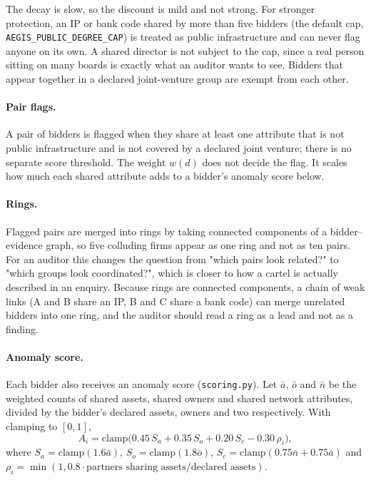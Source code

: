 The decay is slow, so the discount is mild and not strong. For stronger protection, an IP or bank code shared by more than five bidders (the default cap, \texttt{AEGIS\_PUBLIC\_DEGREE\_CAP}) is treated as public infrastructure and can never flag anyone on its own. A shared director is not subject to the cap, since a real person sitting on many boards is exactly what an auditor wants to see. Bidders that appear together in a declared joint-venture group are exempt from each other.

\paragraph{Pair flags.} A pair of bidders is flagged when they share at least one attribute that is not public infrastructure and is not covered by a declared joint venture; there is no separate score threshold. The weight $w(d)$ does not decide the flag. It scales how much each shared attribute adds to a bidder's anomaly score below.

\paragraph{Rings.} Flagged pairs are merged into rings by taking connected components of a bidder--evidence graph, so five colluding firms appear as one ring and not as ten pairs. For an auditor this changes the question from "which pairs look related?" to "which groups look coordinated?", which is closer to how a cartel is actually described in an enquiry. Because rings are connected components, a chain of weak links (A and B share an IP, B and C share a bank code) can merge unrelated bidders into one ring, and the auditor should read a ring as a lead and not as a finding.

\paragraph{Anomaly score.} Each bidder also receives an anomaly score (\texttt{scoring.py}). Let $\bar a$, $\bar o$ and $\bar n$ be the weighted counts of shared assets, shared owners and shared network attributes, divided by the bidder's declared assets, owners and two respectively. With clamping to $[0,1]$,
\begin{equation}
A_i=\mathrm{clamp}\bigl(0.45\,S_a+0.35\,S_o+0.20\,S_c-0.30\,\rho_i\bigr),
\end{equation}
where $S_a=\mathrm{clamp}(1.6\bar a)$, $S_o=\mathrm{clamp}(1.8\bar o)$, $S_c=\mathrm{clamp}(0.75\bar n+0.75\bar a)$ and $\rho_i=\min(1,0.8\cdot\text{partners sharing assets}/\text{declared assets})$.

